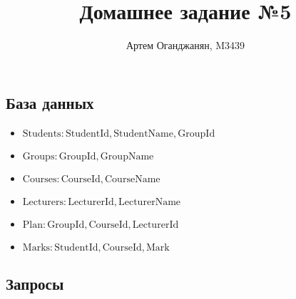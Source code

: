 \documentclass{article}
\title{Домашнее задание №5}
\author{Артем Оганджанян, M3439}
\date{}
\newcommand{\Students}{\mathrm{Students}}
\newcommand{\StudentId}{\mathrm{StudentId}}
\newcommand{\StudentName}{\mathrm{StudentName}}
\newcommand{\Groups}{\mathrm{Groups}}
\newcommand{\GroupId}{\mathrm{GroupId}}
\newcommand{\GroupName}{\mathrm{GroupName}}
\newcommand{\Courses}{\mathrm{Courses}}
\newcommand{\CourseId}{\mathrm{CourseId}}
\newcommand{\CourseName}{\mathrm{CourseName}}
\newcommand{\Plan}{\mathrm{Plan}}
\newcommand{\Lecturers}{\mathrm{Lecturers}}
\newcommand{\LecturerId}{\mathrm{LecturerId}}
\newcommand{\LecturerName}{\mathrm{LecturerName}}
\newcommand{\Marks}{\mathrm{Marks}}
\newcommand{\Mark}{\mathrm{Mark}}
\begin{document}
\maketitle

\subsection{\texorpdfstring{База данных}{DB}}

\begin{itemize}
    \item $\Students: \StudentId, \StudentName, \GroupId$
    \item $\Groups: \GroupId, \GroupName$
    \item $\Courses: \CourseId, \CourseName$
    \item $\Lecturers: \LecturerId, \LecturerName$
    \item $\Plan: \GroupId, \CourseId, \LecturerId$
    \item $\Marks: \StudentId, \CourseId, \Mark$
\end{itemize}

\subsection{\texorpdfstring{Запросы}{Queries}}
\end{document}

